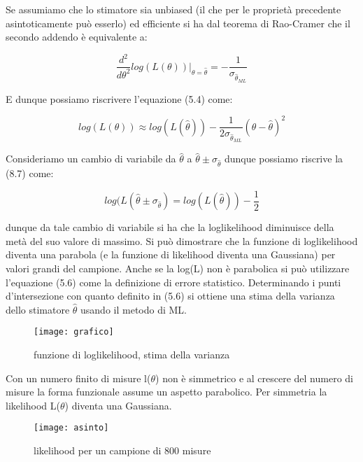 \noindent Se assumiamo che lo stimatore sia unbiased (il che per le propriet\`{a} precedente asintoticamente pu\`{o} esserlo) ed efficiente si ha dal teorema di Rao-Cramer che il secondo addendo \`{e} equivalente a:

\begin{equation*}
		\frac{d^2}{d\theta^2}log(L(\theta))\vert_{\theta = \hat{\theta}} = - \frac{1}{\sigma_{\hat{\theta}_{ML}}}
\end{equation*}

\noindent E dunque possiamo riscrivere l'equazione (5.4) come:


\begin{equation}
	log(L(\theta)) \approx log(L(\hat{\theta})) -\frac{1}{2\sigma_{\hat{\theta}_{ML}}} (\theta - \hat{\theta})^2
\end{equation}

\noindent Consideriamo un cambio di variabile da $\hat{\theta}$ a $\hat{\theta}\pm \sigma_{\hat{\theta}}$ dunque possiamo riscrive la (8.7) come:

\begin{equation}
	log(L(\hat{\theta}\pm \sigma_{\hat{\theta}}) = log(L(\hat{\theta})) - \frac{1}{2}
\end{equation}

\noindent dunque da tale cambio di variabile si ha che la loglikelihood diminuisce della met\`{a} del suo valore di massimo. Si pu\`{o} dimostrare che la funzione di loglikelihood diventa una parabola (e la funzione di likelihood diventa una Gaussiana) per valori grandi del campione. Anche se la log(L) non \`{e} parabolica si pu\`{o} utilizzare l'equazione (5.6) come la definizione di errore statistico. Determinando i punti d'intersezione con quanto definito in (5.6) si ottiene una stima della varianza dello stimatore $\hat{\theta}$ usando il metodo di ML.

 
\begin{figure}[!ht]
\vspace{0.2in}
\texttt{[image: grafico]}	
\centering
\vspace{0.2in}
\caption{funzione di loglikelihood, stima della varianza}
\end{figure}

\noindent Con un numero finito di misure l($\theta$) non \`{e} simmetrico e al crescere del numero di misure la forma funzionale assume un aspetto parabolico. Per simmetria la likelihood L($\theta$) diventa una Gaussiana.

 
\begin{figure}[!ht]
\texttt{[image: asinto]}	
\centering
\caption{likelihood per un campione di 800 misure}
\end{figure}

